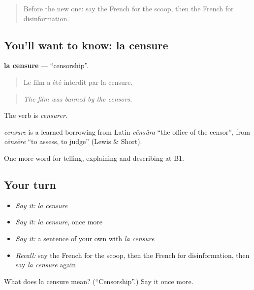 \begin{quote}
Before the new one: say the French for the scoop, then the French for disinformation.
\end{quote}

\subsection*{You'll want to know: la censure}
\textbf{la censure} — \textquotedblleft{}censorship\textquotedblright{}.

\begin{quote}
Le film a été interdit par la censure.
\end{quote}

\begin{quote}
\emph{The film was banned by the censors.}
\end{quote}

The verb is \emph{censurer}.

\begin{cousinweb}
\emph{censure} is a learned borrowing from Latin \emph{cēnsūra} \textquotedblleft{}the office of the censor\textquotedblright{}, from \emph{cēnsēre} \textquotedblleft{}to assess, to judge\textquotedblright{} (Lewis \& Short).
\end{cousinweb}

\begin{grammarlens}[title={What you've built}]
One more word for telling, explaining and describing at B1.
\end{grammarlens}

\subsection*{Your turn}
\begin{itemize}
\raggedright
  \item \emph{Say it:} \emph{la censure}
  \item \emph{Say it:} \emph{la censure}, once more
  \item \emph{Say it:} a sentence of your own with \emph{la censure}
  \item \emph{Recall:} say the French for the scoop, then the French for disinformation, then say \emph{la censure} again
\end{itemize}

\begin{tcolorbox}[breakable,colback=teal!4,colframe=teal!35!black,title={Before you move on}]
What does la censure mean? (\textquotedblleft{}Censorship\textquotedblright{}.) Say it once more.
\end{tcolorbox}
